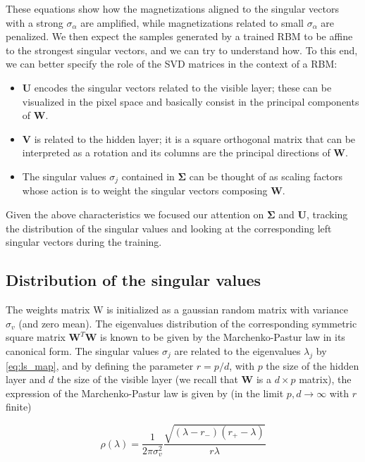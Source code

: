 \documentclass[notitlepage]{revtex4-1}
\begin{document}
These equations show how the magnetizations aligned to the singular vectors with a strong \(\sigma_{\alpha}\) are amplified, while magnetizations related to small \(\sigma_{\alpha}\) are penalized. We then expect the samples generated by a trained RBM to be affine to the strongest singular vectors, and we can try to understand how. To this end, we can better specify the role of the SVD matrices in the context of a RBM:

\begin{itemize}
\item \(\mathbf{U}\) encodes the singular vectors related to the visible layer; these can be visualized in the pixel space and basically consist in the principal components of \(\mathbf{W}\).
\item  \(\mathbf{V}\) is related to the hidden layer; it is a square orthogonal matrix that can be interpreted as a rotation and its columns are the principal directions of \(\mathbf{W}\).
\item The singular values \( {\sigma}_j \) contained in \(\mathbf{\Sigma}\) can be thought of as scaling factors whose action is to weight the singular vectors composing \(\mathbf{W}\).
\end{itemize}

Given the above characteristics we focused our attention on \(\mathbf{\Sigma}\) and \(\mathbf{U}\), tracking the distribution of the singular values and looking at the corresponding left singular vectors during the training.

\subsection{Distribution of the singular values}
The weights matrix W is initialized as a gaussian random matrix with variance \(\sigma_v\) (and zero mean). The eigenvalues distribution of the corresponding symmetric square matrix \(\mathbf{W}^T \mathbf{W} \) is known to be given by the Marchenko-Pastur law \cite{MP_law} in its canonical form. The singular values \(\sigma_j\) are related to the eigenvalues \(\lambda_j\) by \eqref{eq:ls_map}, and by defining the parameter \( r = p/d \), with \(p\) the size of the hidden layer and \(d\) the size of the visible layer (we recall that \(\mathbf{W}\) is a \(d \times p\) matrix), the expression of the Marchenko-Pastur law is given by (in the limit \( p,d \to \infty \) with \(r\) finite)

\begin{equation}
\rho (\lambda) = \frac{1}{2 \pi \sigma_v^2} \frac{\sqrt{(\lambda - r_-)(r_+ - \lambda)}}{r \lambda}
\end{equation}
\end{document}
